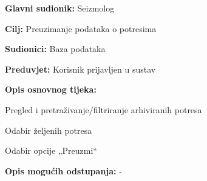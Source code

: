 				\noindent {}
				\begin{packed_item}
					
					\item \textbf{Glavni sudionik:} Seizmolog
					\item \textbf{Cilj:} Preuzimanje podataka o potresima
					\item \textbf{Sudionici:} Baza podataka
					\item \textbf{Preduvjet:} Korisnik prijavljen u sustav
					
					\item \textbf{Opis osnovnog tijeka:}
					
					\item[] \begin{packed_enum}
						\item Pregled i pretraživanje/filtriranje arhiviranih potresa
						\item Odabir željenih potresa
						\item Odabir opcije „Preuzmi“
					\end{packed_enum}
					
					\item  \textbf{Opis mogućih odstupanja:} -
					
				\end{packed_item}
			

